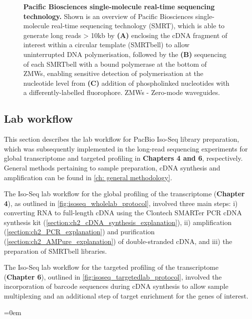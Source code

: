 \begin{figure}[!h]
	\captionsetup{width=0.95\textwidth}
	\caption[Pacific Biosciences single-molecule real-time sequencing technology]%
	{\textbf{Pacific Biosciences single-molecule real-time sequencing technology.} Shown is an overview of Pacific Biosciences single-molecule real-time sequencing technology (SMRT), which is able to generate long reads > 10kb by \textbf{(A)} enclosing the cDNA fragment of interest within a circular template (SMRTbell) to allow uninterrupted DNA polymerisation,  followed by the \textbf{(B)} sequencing of each SMRTbell with a bound polymerase at the bottom of ZMWs, enabling sensitive detection of polymerisation at the nucleotide level from \textbf{(C)} addition of phospholinked nucleotides with a differently-labelled fluorophore. ZMWs - Zero-mode waveguides.}
	\label{fig:Mechanism}
\end{figure}

\clearpage
\subsection{Lab workflow}
\label{chap:isoseq_labpipeline}
This section describes the lab workflow for PacBio Iso-Seq library preparation, which was subsequently implemented in the long-read sequencing experiments for global transcriptome and targeted profiling in \textbf{Chapters 4 and 6}, respectively. General methods pertaining to sample preparation, cDNA synthesis and amplification can be found in \cref{ch: general methodology}.

The Iso-Seq lab workflow for the global profiling of the transcriptome (\textbf{Chapter 4}), as outlined in \cref{fig:isoseq_wholelab_protocol}, involved three main steps: i) converting RNA to full-length cDNA using the Clontech SMARTer PCR cDNA synthesis kit (\cref{section:ch2_cDNA_synthesis_explanation}), ii) amplification (\cref{section:ch2_PCR_explanation}) and purification (\cref{section:ch2_AMPure_explanation}) of double-stranded cDNA, and iii) the preparation of SMRTbell libraries. 

The Iso-Seq lab workflow for the targeted profiling of the transcriptome (\textbf{Chapter 6}), outlined in \cref{fig:isoseq_targetedlab_protocol}, involved the incorporation of barcode sequences during cDNA synthesis to allow sample multiplexing and an additional step of target enrichment for the genes of interest.

\vspace{3cm}
\begingroup
\parindent=0em
\localtableofcontents 
\endgroup

